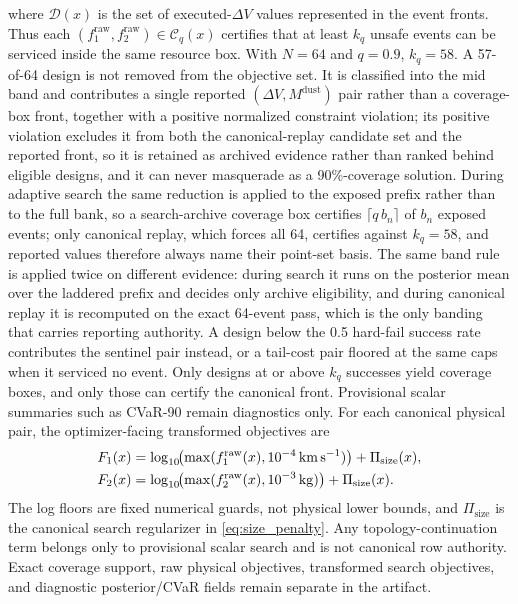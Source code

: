     where \(\mathcal{D}(x)\) is the set of executed-\(\Delta V\) values represented in the event fronts. Thus each \((f_1^{\mathrm{raw}},f_2^{\mathrm{raw}})\in\mathcal{C}_q(x)\) certifies that at least \(k_q\) unsafe events can be serviced inside the same resource box. With \(N=64\) and \(q=0.9\), \(k_q=58\). A 57-of-64 design is not removed from the objective set. It is classified into the mid band and contributes a single reported \((\Delta V,M^{\mathrm{dust}})\) pair rather than a coverage-box front, together with a positive normalized constraint violation; its positive violation excludes it from both the canonical-replay candidate set and the reported front, so it is retained as archived evidence rather than ranked behind eligible designs, and it can never masquerade as a 90\%-coverage solution. During adaptive search the same reduction is applied to the exposed prefix rather than to the full bank, so a search-archive coverage box certifies \(\lceil q\,b_n\rceil\) of \(b_n\) exposed events; only canonical replay, which forces all 64, certifies against \(k_q=58\), and reported values therefore always name their point-set basis. The same band rule is applied twice on different evidence: during search it runs on the posterior mean over the laddered prefix and decides only archive eligibility, and during canonical replay it is recomputed on the exact 64-event pass, which is the only banding that carries reporting authority. A design below the \num{0.5} hard-fail success rate contributes the sentinel pair instead, or a tail-cost pair floored at the same caps when it serviced no event. Only designs at or above \(k_q\) successes yield coverage boxes, and only those can certify the canonical front. Provisional scalar summaries such as CVaR-90 remain diagnostics only. For each canonical physical pair, the optimizer-facing transformed objectives are
    \begin{equation}
        \begin{aligned}
            F_{1}(x) &= \log_{10}\!\bigl(\max(f_1^{\mathrm{raw}}(x),10^{-4}\,\si{\kilo\metre\per\second})\bigr)+\Pi_{\mathrm{size}}(x),\\
            F_{2}(x) &= \log_{10}\!\bigl(\max(f_2^{\mathrm{raw}}(x),10^{-3}\,\si{\kilogram})\bigr)+\Pi_{\mathrm{size}}(x).
        \end{aligned}
    \end{equation}
    The log floors are fixed numerical guards, not physical lower bounds, and \(\Pi_{\mathrm{size}}\) is the canonical search regularizer in \cref{eq:size_penalty}. Any topology-continuation term belongs only to provisional scalar search and is not canonical row authority. Exact coverage support, raw physical objectives, transformed search objectives, and diagnostic posterior/CVaR fields remain separate in the artifact.

